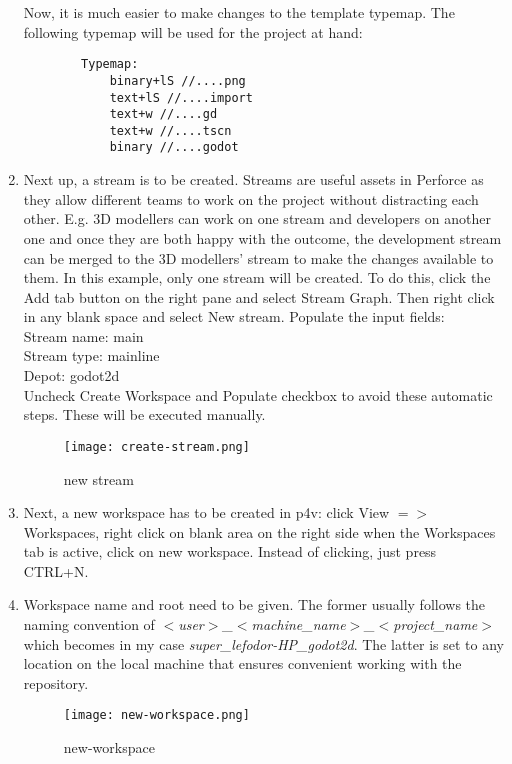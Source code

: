 \begin{enumerate}
\begin{verbatim}
    \end{verbatim}
    Now, it is much easier to make changes to the template typemap.
    The following typemap will be used for the project at hand:
    \begin{verbatim}
        Typemap:
            binary+lS //....png
            text+lS //....import
            text+w //....gd
            text+w //....tscn
            binary //....godot
    \end{verbatim}
    \item Next up, a stream is to be created. Streams are useful assets in Perforce as they allow different
    teams to work on the project without distracting each other. E.g. 3D modellers can work on one stream and developers 
    on another one and once they are both happy with the outcome, the development stream can be merged to the 3D modellers'
    stream to make the changes available to them. In this example, only one stream will be created.
    To do this, click the Add tab button on the right pane and select Stream Graph. Then right click in any blank space
    and select New stream. Populate the input fields: \\
    Stream name: main \\
    Stream type: mainline \\
    Depot: godot2d \\
    Uncheck Create Workspace and Populate checkbox to avoid these automatic steps. These will be executed manually.
    \begin{figure}[H]
        \centering
        \texttt{[image: create-stream.png]}
          \caption{new stream}
          \label{fig:new-stream}
    \end{figure}
    \item Next, a new workspace has to be created in p4v: click View {$=>$} Workspaces, right click on blank area on the
    right side when the Workspaces tab is active, click on new workspace. Instead of clicking, just press CTRL+N.
    \item Workspace name and root need to be given. The former usually follows the naming convention of 
    \textit{$<$user$>$\_$<$machine\_name$>$\_$<$project\_name$>$} which becomes in my case 
    \textit{super\_lefodor-HP\_godot2d}. The latter is set to any location on the local machine that ensures convenient
    working with the repository.
    \begin{figure}[H]
        \centering
        \texttt{[image: new-workspace.png]}
          \caption{new-workspace}

\end{figure}
\end{enumerate}
